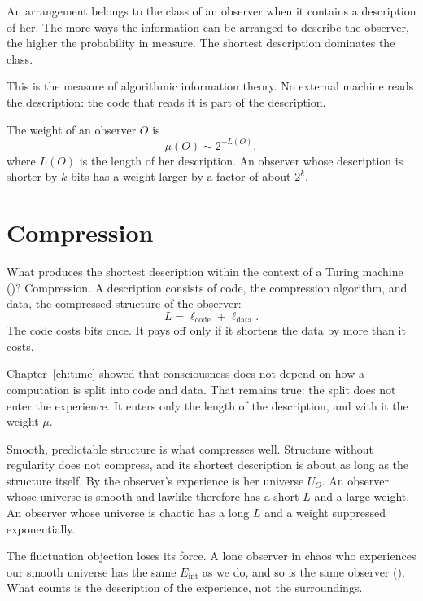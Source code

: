 \documentclass[11pt]{book}
\begin{document}
An arrangement belongs to the class of an observer when it contains
a description of her. The more ways the information can be arranged to
describe the observer, the higher the probability in measure. The shortest description
dominates the class.

This is the measure of algorithmic information theory. No external machine reads the description: the code that
reads it is part of the description.

\begin{deduction}\label{ded:measure}
  The weight of an observer $O$ is
  \[
    \mu(O) \sim 2^{-L(O)},
  \]
  where $L(O)$ is the length of her description. An observer
  whose description is shorter by $k$ bits has a weight larger by a factor
  of about $2^k$.
\end{deduction}


\section{Compression}
\label{sec:compression}

What produces the shortest description within the context of a Turing
machine ()? Compression. A description consists of
code, the compression algorithm, and data, the compressed structure of the
observer:
\[
  L = \ell_{\mathrm{code}} + \ell_{\mathrm{data}}.
\]
The code costs bits once. It pays off only if it shortens the data by more
than it costs.

Chapter~\ref{ch:time} showed that consciousness does not depend on how a
computation is split into code and data. That remains true: the split does
not enter the experience. It enters only the length of the description, and
with it the weight $\mu$.

Smooth, predictable structure is what compresses well. Structure without
regularity does not compress, and its shortest description is about as
long as the structure itself. By  the observer's
experience is her universe $U_O$. An observer whose universe is smooth and
lawlike therefore has a short $L$ and a large weight. An observer whose
universe is chaotic has a long $L$ and a weight suppressed exponentially.

The fluctuation objection loses its force. A lone observer in chaos who
experiences our smooth universe has the same $E_{\mathrm{int}}$ as we do,
and so is the same observer (). What counts is the
description of the experience, not the surroundings.
\end{document}
